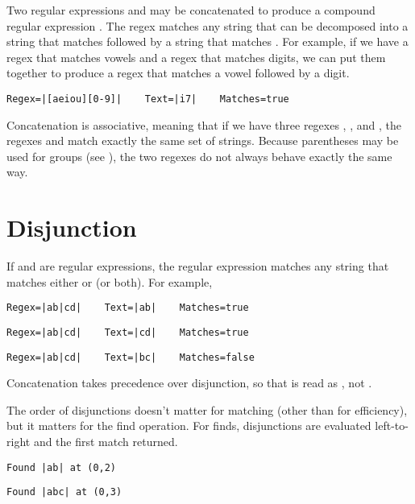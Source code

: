 Two regular expressions  and  may be
concatenated to produce a compound regular expression .
The regex  matches any string that can be decomposed into
a string that matches  followed by a string that matches
.  For example, if we have a regex \code{[aeiou]} that
matches vowels and a regex  that matches digits, we can put
them together to produce a regex that matches a vowel followed by a
digit.
%
\begin{verbatim}
Regex=|[aeiou][0-9]|    Text=|i7|    Matches=true
\end{verbatim}

Concatenation is associative, meaning that if we have three regexes
, , and , the regexes
 and
 match exactly the same set
of strings.  Because parentheses may be used for groups (see
), the two regexes do not always behave exactly
the same way.  


\section{Disjunction}

If  and  are regular expressions, the regular
expression \code{|} matches any string that
matches either  or  (or both).  For example,
%
\begin{verbatim}
Regex=|ab|cd|    Text=|ab|    Matches=true
\end{verbatim}
%
\begin{verbatim}
Regex=|ab|cd|    Text=|cd|    Matches=true
\end{verbatim}
%
\begin{verbatim}
Regex=|ab|cd|    Text=|bc|    Matches=false
\end{verbatim}
%
Concatenation takes precedence over disjunction, so that 
is read as , not .  

The order of disjunctions doesn't matter for matching (other than for
efficiency), but it matters for the find operation.  For finds,
disjunctions are evaluated left-to-right and the first match returned.
%
\begin{verbatim}
Found |ab| at (0,2)
\end{verbatim}
%
\begin{verbatim}
Found |abc| at (0,3)
\end{verbatim}
%

